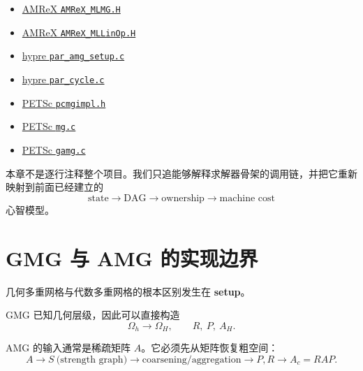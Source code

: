 \begin{itemize}
\item \href{https://github.com/AMReX-Codes/amrex/blob/fca855037a2184aae8fbfe4ff7b5435e182e7cfa/Src/LinearSolvers/MLMG/AMReX_MLMG.H}{AMReX \texttt{AMReX\_MLMG.H}}
\item \href{https://github.com/AMReX-Codes/amrex/blob/fca855037a2184aae8fbfe4ff7b5435e182e7cfa/Src/LinearSolvers/MLMG/AMReX_MLLinOp.H}{AMReX \texttt{AMReX\_MLLinOp.H}}
\item \href{https://github.com/hypre-space/hypre/blob/5b582610a113ede9162a5744d33873b860498a11/src/parcsr_ls/par_amg_setup.c}{hypre \texttt{par\_amg\_setup.c}}
\item \href{https://github.com/hypre-space/hypre/blob/5b582610a113ede9162a5744d33873b860498a11/src/parcsr_ls/par_cycle.c}{hypre \texttt{par\_cycle.c}}
\item \href{https://github.com/petsc/petsc/blob/0239ddb405da990d3e3adce5fef62d8582258e84/include/petsc/private/pcmgimpl.h}{PETSc \texttt{pcmgimpl.h}}
\item \href{https://github.com/petsc/petsc/blob/0239ddb405da990d3e3adce5fef62d8582258e84/src/ksp/pc/impls/mg/mg.c}{PETSc \texttt{mg.c}}
\item \href{https://github.com/petsc/petsc/blob/0239ddb405da990d3e3adce5fef62d8582258e84/src/ksp/pc/impls/gamg/gamg.c}{PETSc \texttt{gamg.c}}
\end{itemize}

本章不是逐行注释整个项目。我们只追能够解释求解器骨架的调用链，并把它重新映射到前面已经建立的
\[
\text{state}
\rightarrow
\text{DAG}
\rightarrow
\text{ownership}
\rightarrow
\text{machine cost}
\]
心智模型。

\section{GMG 与 AMG 的实现边界}

几何多重网格与代数多重网格的根本区别发生在 \textbf{setup}。

GMG 已知几何层级，因此可以直接构造
\begin{equation}
\Omega_h
\rightarrow
\Omega_H,
\qquad
R,\ P,\ A_H.
\end{equation}

AMG 的输入通常是稀疏矩阵 $A$。它必须先从矩阵恢复粗空间：
\begin{equation}
\boxed{
A
\rightarrow
S\ \text{(strength graph)}
\rightarrow
\text{coarsening/aggregation}
\rightarrow
P,R
\rightarrow
A_c=RAP.
}
\label{eq:software-amg-setup-chain}
\end{equation}

